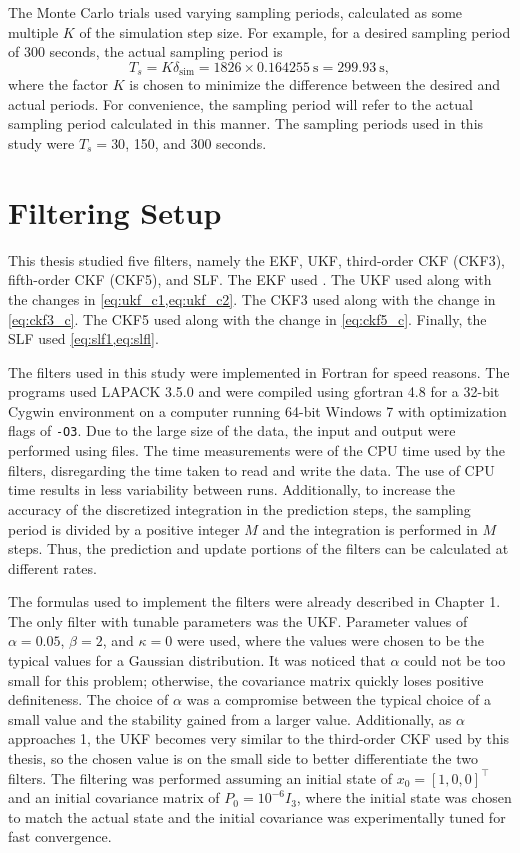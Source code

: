 \documentclass[../zhang_thesis.tex]{subfiles}
\begin{document}
The Monte Carlo trials used varying sampling periods, calculated as some multiple $K$ of the simulation step size. For example, for a desired sampling period of 300 seconds, the actual sampling period is
\begin{equation}
    T_s = K \delta_\text{sim} = 1826 \times 0.164255~\text{s} = 299.93~\text{s},
\end{equation}
where the factor $K$ is chosen to minimize the difference between the desired and actual periods. For convenience, the sampling period will refer to the actual sampling period calculated in this manner. The sampling periods used in this study were $T_s=30$, 150, and 300 seconds.

\section{Filtering Setup}

This thesis studied five filters, namely the EKF, UKF, third-order CKF (CKF3), fifth-order CKF (CKF5), and SLF. The EKF used . The UKF used  along with the changes in \cref{eq:ukf_c1,eq:ukf_c2}. The CKF3 used  along with the change in \cref{eq:ckf3_c}. The CKF5 used  along with the change in \cref{eq:ckf5_c}. Finally, the SLF used \cref{eq:slf1,eq:slfl}.

The filters used in this study were implemented in Fortran for speed reasons. The programs used LAPACK 3.5.0 and were compiled using gfortran 4.8 for a 32-bit Cygwin environment on a computer running 64-bit Windows 7 with optimization flags of \texttt{-O3}. Due to the large size of the data, the input and output were performed using files. The time measurements were of the CPU time used by the filters, disregarding the time taken to read and write the data. The use of CPU time results in less
variability between runs. Additionally, to increase the accuracy of the discretized integration in the prediction steps, the sampling period is divided by a positive integer $M$ and the integration is performed in $M$ steps. Thus, the prediction and update portions of the filters can be calculated at different rates.

The formulas used to implement the filters were already described in Chapter 1. The only filter with tunable parameters was the UKF. Parameter values of $\alpha=0.05$, $\beta=2$, and $\kappa=0$ were used, where the values were chosen to be the typical values for a Gaussian distribution. It was noticed that $\alpha$ could not be too small for this problem; otherwise, the covariance matrix quickly loses positive definiteness. The choice of $\alpha$ was a compromise between the typical
choice of a small value and the stability gained from a larger value. Additionally, as $\alpha$ approaches 1, the UKF becomes very similar to the third-order CKF used by this thesis, so the chosen value is on the small side to better differentiate the two filters. The filtering was performed assuming an initial state of $x_0=[1,0,0]^\top$ and an initial covariance matrix of $P_0=10^{-6} I_3$, where the initial state was chosen to match the actual state and the initial covariance was experimentally tuned for fast convergence. 
\end{document}
